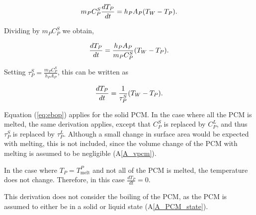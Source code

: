 \documentclass[12pt]{article}
\newcommand{\aref}[1]{A\ref{#1}}
\begin{document}
\begin{equation*}
\\m_P C^S_P \frac{dT_P}{dt} = h_P A_P (T_W - T_P).
\end{equation*}

\noindent
Dividing by $m_P C^S_P$ we obtain,

\begin{equation*}
\\\frac{dT_P}{dt} = \frac{h_P A_P}{m_P C^S_P} (T_W - T_P).
\end{equation*}

\noindent
Setting $\tau_P^S = \frac{m_P C_P^S}{h_P A_P}$, this can be written as

\begin{equation}
\\\frac{dT_P}{dt} = \frac{1}{\tau_P^S} (T_W - T_P). \label{eq:ebop}
\end{equation}

Equation (\ref{eq:ebop}) applies for the solid PCM.  In the case where all the PCM
is melted, the same derivation applies, except that $C_P^S$ is replaced by
$C_P^L$, and thus $\tau_P^S$ is replaced by $\tau_P^L$.  Although a small change
in surface area would be expected with melting, this is not included, since the
volume change of the PCM with melting is assumed to be negligible (\aref{A_vpcm}).

In the case where $T_P = T_\text{melt}^P$ and not all of the PCM is melted, the
temperature does not change.  Therefore, in this case $\frac{d T_P}{dt} = 0$.

This derivation does not consider the boiling of the PCM, as the PCM is assumed
to either be in a solid or liquid state (\aref{A_PCM_state}).

~\newline

\end{document}
